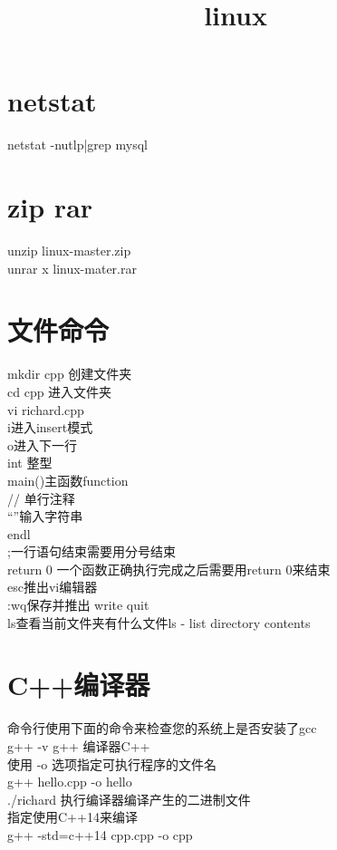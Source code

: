\documentclass[12pt,twiside,a4paper]{book}
\numberwithin{chapter}{part}
\begin{document}
\author
{
}

\title{linux}
\maketitle
\tableofcontents %
\newpage
\pagestyle{fancy}


\section{netstat}
netstat -nutlp|grep mysql 

\section{zip rar}
unzip linux-master.zip\\
unrar x linux-mater.rar

\section{文件命令}
mkdir cpp 创建文件夹\\
cd cpp 进入文件夹\\
vi richard.cpp\\
i进入insert模式\\
o进入下一行\\
int 整型\\
main()主函数function\\
// 单行注释\\
“”输入字符串\\
endl\\
;一行语句结束需要用分号结束\\
return 0 一个函数正确执行完成之后需要用return 0来结束\\
esc推出vi编辑器\\
:wq保存并推出 write quit\\
ls查看当前文件夹有什么文件ls - list directory contents

\section{C++编译器}
命令行使用下面的命令来检查您的系统上是否安装了gcc\\
g++ -v
g++ 编译器C++\\
使用 -o 选项指定可执行程序的文件名\\
g++ hello.cpp -o hello\\
./richard 执行编译器编译产生的二进制文件\\
指定使用C++14来编译\\
g++ -std=c++14 cpp.cpp -o cpp 
\end{document}
